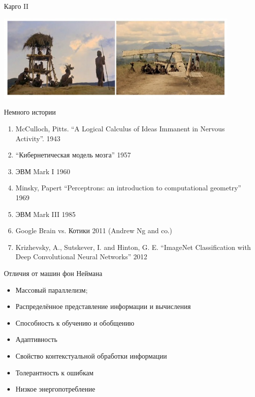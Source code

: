 \documentclass[14pt, fleqn, xcolor={dvipsnames, table}]{beamer}
\begin{document}
\begin{frame}{Карго II}
\begin{center}
\includegraphics[width=0.9\textwidth]{cult_cargo}
\end{center}
\end{frame}



\begin{frame}{Немного истории}
\begin{enumerate}
  \item McCulloch, Pitts. ``A Logical Calculus of Ideas Immanent in Nervous Activity''. 1943
  \item ``Кибернетическая модель мозга'' 1957
  \item ЭВМ Mark I 1960
  \item Minsky, Papert ``Perceptrons: an introduction to computational geometry'' 1969
  \item ЭВМ Mark III 1985
  \item Google Brain vs. Котики 2011 (Andrew Ng and co.)
  \item Krizhevsky, A., Sutskever, I. and Hinton, G. E. ``ImageNet Classification with Deep Convolutional Neural Networks'' 2012
\end{enumerate}

\end{frame}

\begin{frame}{Отличия от машин фон Неймана}
\begin{itemize}
  \item Массовый параллелизм;
  \item Распределённое представление информации и вычисления
  \item Способность к обучению и обобщению
  \item Адаптивность
  \item Свойство контекстуальной обработки информации
  \item Толерантность к ошибкам
  \item Низкое энергопотребление
\end{itemize}
\end{frame}
\end{document}
